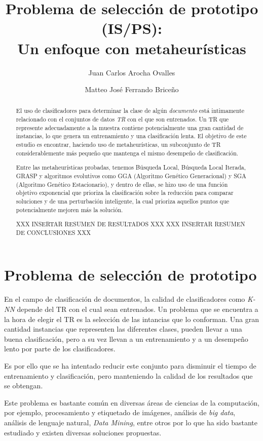 \documentclass{ci5652}
\title{Problema de selección de prototipo (IS/PS):\\
       Un enfoque con metaheurísticas}
\author{Juan Carlos Arocha Ovalles
        \and
        Matteo José Ferrando Briceño}
\begin{document}
\thispagestyle{empty}
\maketitle


\begin{abstract}
El uso de clasificadores para determinar la clase de algún \textit{documento} está intimamente relacionado con el conjuntos de datos \textit{TR} con el que son entrenados. Un TR que represente adecuadamente a la muestra contiene potencialmente una gran cantidad de instancias, lo que genera un entrenamiento y una clasificación lenta. El objetivo de este estudio es encontrar, haciendo uso de metaheurísticas, un subconjunto de TR considerablemente más pequeño que mantenga el mismo desempeño de clasificación.

Entre las metaheurísticas probadas, tenemos Búsqueda Local, Búsqueda Local Iterada, GRASP y algoritmos evolutivos como GGA (Algoritmo Genético Generacional) y SGA (Algoritmo Genético Estacionario), y  dentro de ellas, se hizo uso de una función objetivo exponencial que prioriza la clasificación sobre la reducción para comparar soluciones y de una perturbación inteligente, la cual prioriza aquellos puntos que potencialmente mejoren más la solución.

XXX INSERTAR RESUMEN DE RESULTADOS XXX
XXX INSERTAR RESUMEN DE CONCLUSIONES XXX


\end{abstract}

\section{Problema de selección de prototipo}

En el campo de clasificación de documentos, la calidad de clasificadores como \textit{K-NN} depende del TR con el cual sean entrenados. Un problema que se encuentra a la hora de elegir el TR es la selección de las intancias que lo conforman. Una gran cantidad instancias que representen las diferentes clases, pueden llevar a una buena clasificación, pero a su vez llevan a un entrenamiento y a un desempeño lento por parte de los clasificadores.

Es por ello que se ha intentado reducir este conjunto para disminuir el tiempo de entrenamiento y clasificación, pero manteniendo la calidad de los resultados que se obtengan.

Este problema es bastante común en diversas áreas de ciencias de la computación, por ejemplo, procesamiento y etiquetado de imágenes, análisis de \textit{big data}, análisis de lenguaje natural, \textit{Data Mining}, entre otros por lo que ha sido bastante estudiado y existen diversas soluciones propuestas.
\end{document}
